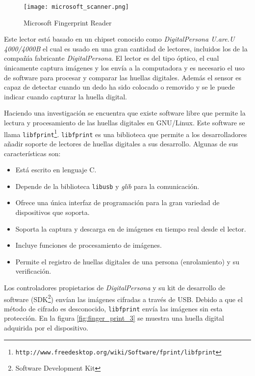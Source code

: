 \begin{figure}[htb]
 \begin{center}
  \texttt{[image: microsoft\_scanner.png]}
 \end{center}
 \caption{Microsoft Fingerprint Reader}
 \label{fig:finger_print_2}
\end{figure}

Este lector está basado en un chipset conocido como \textit{DigitalPersona U.are.U 4000/4000B} el cual es usado en una gran cantidad de lectores, incluidos los de la compañía fabricante \textit{DigitalPersona}. El lector es del tipo óptico, el cual únicamente captura imágenes y los envía a la computadora y es necesario el uso de software para procesar y comparar las huellas digitales. Además el sensor es capaz de detectar cuando un dedo ha sido colocado o removido y se le puede indicar cuando capturar la huella digital.

Haciendo una investigación se encuentra que existe software libre que permite la lectura y procesamiento de las huellas digitales en GNU/Linux. Este software se llama \texttt{libfprint\footnote{http://www.freedesktop.org/wiki/Software/fprint/libfprint}}.  \texttt{libfprint} es una biblioteca que permite a los desarrolladores añadir soporte de lectores de huellas digitales a sus desarrollo. Algunas de sus características son:

\begin{itemize}
 \item Está escrito en lenguaje C.
 \item Depende de la biblioteca \texttt{libusb} y \textit{glib} para la comunicación.
 \item Ofrece una única interfaz de programación para la gran variedad de dispositivos que soporta.
 \item Soporta la captura y descarga en de imágenes en tiempo real desde el lector.
 \item Incluye funciones de procesamiento de imágenes.
 \item Permite el registro de huellas digitales de una persona (enrolamiento) y su verificación.
\end{itemize}

Los controladores propietarios de \textit{DigitalPersona} y su kit de desarrollo de software (SDK\footnote{Software Development Kit}) envían las imágenes cifradas a través de USB. Debido a que el método de cifrado es desconocido,  \texttt{libfprint} envía las imágenes sin esta protección. En la figura \ref{fig:finger_print_3} se muestra una huella digital adquirida por el dispositivo.

